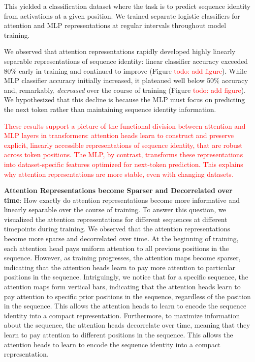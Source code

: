\documentclass{article}
\theoremstyle{plain}
\theoremstyle{definition}
\theoremstyle{remark}
\begin{document}
 This yielded a classification dataset where the task is to predict sequence identity from activations at a given position.
  We trained separate logistic classifiers 
  for attention and MLP representations at regular intervals throughout model training. 
   
We observed that attention representations rapidly developed highly linearly separable representations
 of sequence identity: linear classifier accuracy exceeded 80\% early
  in training and continued to improve (Figure \textcolor{red}{todo: add figure}). 
  While MLP classifier accuracy initially increased, it 
  plateaued well below 50\% accuracy and, 
  remarkably, \textit{decreased} over the course of training (Figure \textcolor{red}{todo: add figure}). 
  We hypothesized that this decline is because the MLP must focus on predicting the next token 
  rather than maintaining sequence identity information.

\textcolor{red}{These results support a picture of the functional division 
between attention and MLP layers in transformers: 
attention heads learn to construct and preserve explicit, 
linearly accessible representations of sequence identity,
 that are robust across token positions. 
The MLP, by contrast, transforms these representations into dataset-specific
 features optimized for next-token prediction.
  This explains why attention representations are 
  more stable, even with changing datasets.}


  \textbf{Attention Representations become Sparser and Decorrelated over time}:
  How exactly do attention representations become more 
  informative and linearly separable over the course of training. 
  To answer this question, we visualized the attention 
  representations for different sequences at different timepoints during training.
  We observed that the attention representations become more sparse and decorrelated over time.
  At the beginning of training, each attention head pays 
  uniform attention to all previous positions in the sequence.  
  However, as training progresses, the attention maps 
  become sparser, indicating that the attention heads learn to pay more attention to 
   particular positions in the sequence. 
Intriguingly, we notice that for a specific sequence, 
the attention maps form vertical bars, indicating that the attention heads learn to pay attention
 to specific prior positions in the sequence, regardless of the position in the sequence.
This allows the attention heads to learn to encode  
the sequence identity into a compact representation. 
Furthermore, to maximize information
 about the sequence, 
 the attention heads decorrelate over time, 
 meaning that they learn to pay attention to
  different positions in the sequence.
 This allows the attention heads to learn to encode the sequence identity into a compact representation.
\end{document}
